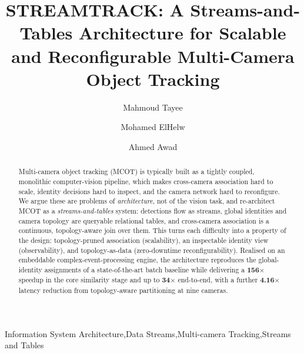 \documentclass[review]{elsarticle}
\begin{document}
\begin{frontmatter}
    \title{STREAMTRACK: A Streams-and-Tables Architecture for Scalable and Reconfigurable Multi-Camera Object Tracking}
    \author[add1]{Mahmoud Tayee}%
    \author[add1]{Mohamed ElHelw}%
    \author[add2,add3]{Ahmed Awad}

\address[add1]{Nile University, Giza, Egypt}
\address[add2]{Faculty of Computers and Artificial Intelligence, Cairo University, Egypt}
\address[add3]{The British University in Dubai, Dubai, The UAE}

\begin{abstract}
Multi-camera object tracking (MCOT) is typically built as a tightly coupled, monolithic computer-vision pipeline, which makes cross-camera association hard to scale, identity decisions hard to inspect, and the camera network hard to reconfigure. We argue these are problems of \emph{architecture}, not of the vision task, and re-architect MCOT as a \emph{streams-and-tables} system: detections flow as streams, global identities and camera topology are queryable relational tables, and cross-camera association is a continuous, topology-aware join over them. 
This turns each difficulty into a property of the design: topology-pruned association (scalability), an inspectable identity view (observability), and topology-as-data (zero-downtime reconfigurability). Realised on an embeddable complex-event-processing engine, the architecture reproduces the global-identity assignments of a state-of-the-art batch baseline while delivering a \textbf{156$\times$} speedup in the core similarity stage and up to \textbf{34$\times$} end-to-end, with a further \textbf{4.16$\times$} latency reduction from topology-aware partitioning at nine cameras.
\end{abstract}


\begin{keyword}
Information System Architecture\sep Data Streams\sep Multi-camera Tracking\sep Streams and Tables
\end{keyword}

\end{frontmatter}
\end{document}
